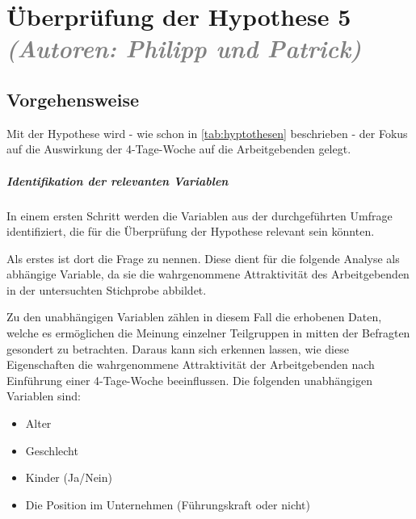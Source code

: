 

\chapter{Überprüfung der Hypothese 5 \textit{\textcolor{gray}{(Autoren: Philipp und Patrick)}}}
\label{chap:hypothese5}


\section{Vorgehensweise}
Mit der Hypothese  wird - wie schon in \ref{tab:hyptothesen} beschrieben - der 
Fokus auf die Auswirkung der 4-Tage-Woche auf die Arbeitgebenden gelegt. 

\paragraph{Identifikation der relevanten Variablen}
In einem ersten Schritt werden die Variablen aus der durchgeführten Umfrage identifiziert, die für die 
Überprüfung der Hypothese relevant sein könnten.

Als erstes ist dort die Frage  zu nennen. Diese dient für die folgende Analyse als abhängige 
Variable, da sie die wahrgenommene Attraktivität des Arbeitgebenden in der untersuchten Stichprobe abbildet.

Zu den unabhängigen Variablen zählen in diesem Fall die erhobenen Daten, welche es ermöglichen die Meinung 
einzelner Teilgruppen in mitten der Befragten gesondert zu betrachten. Daraus kann sich erkennen lassen, wie diese
Eigenschaften die wahrgenommene Attraktivität der Arbeitgebenden nach Einführung einer 4-Tage-Woche beeinflussen.
Die folgenden unabhängigen Variablen sind:
\begin{itemize}
  \item Alter
  \item Geschlecht
  \item Kinder (Ja/Nein)
  \item Die Position im Unternehmen (Führungskraft oder nicht)
\end{itemize}


